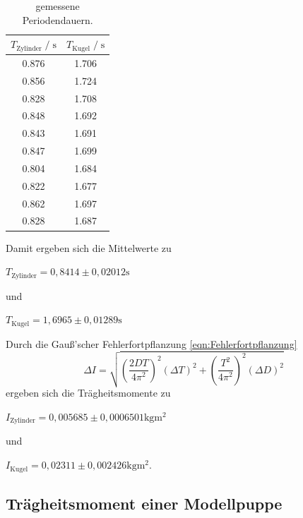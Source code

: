 \begin{table}[H]
  \centering
   \caption{gemessene Periodendauern.}
   \label{tab:traegheitsmomente}
   \begin{tabular}{c c}
      \toprule
      $ T_{\text{Zylinder}} \;/\; \si{\second}$ & $ T_{\text{Kugel}} \;/\; \si{\second}$ \\
      \midrule
      0.876 & 1.706 \\
      0.856 & 1.724 \\
      0.828 & 1.708 \\
      0.848 & 1.692 \\
      0.843 & 1.691 \\
      0.847 & 1.699 \\
      0.804 & 1.684 \\
      0.822 & 1.677 \\
      0.862 & 1.697 \\
      0.828 & 1.687 \\
      \bottomrule
   \end{tabular}
\end{table}

Damit ergeben sich die Mittelwerte zu 

\begin{center}
  $T_{\text{Zylinder}} = 0,8414 \pm 0,02012 \si{\second} $
\end{center}

und

\begin{center}
  $ T_{\text{Kugel}} = 1,6965 \pm 0,01289 \si{\second} $
\end{center}

Durch die Gauß'scher Fehlerfortpflanzung \ref{eqn:Fehlerfortpflanzung}
\begin{equation}
  \Delta I = \sqrt{ (\frac{2DT}{4\pi^2})^2  (\Delta T)^2 + (\frac{T^2}{4\pi^2})^2 (\Delta D)^2}
  \label{eqn:Fehlerfortpflanzung}
\end{equation}
ergeben sich die Trägheitsmomente zu

\begin{center}
  $ I_{\text{Zylinder}} = 0,005685 \pm 0,0006501 \si{\kilogram\meter^2} $ 
\end{center}

und

\begin{center}
  $ I_{\text{Kugel}} = 0,02311 \pm 0,002426 \si{\kilogram\meter^2} $.
\end{center}


\subsection{Trägheitsmoment einer Modellpuppe}
\label{sec:Trägheitsmoment einer Modellpuppe}

